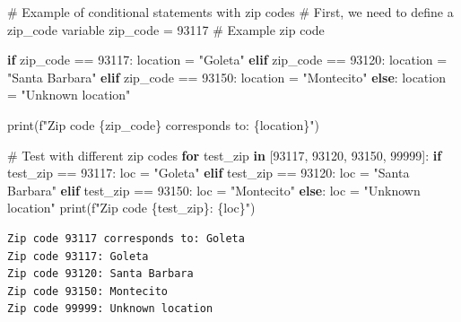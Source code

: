 \documentclass[
  11pt,
]{article}
\newenvironment{Shaded}{\begin{snugshade}}{\end{snugshade}}
\newcommand{\BuiltInTok}[1]{\textcolor[rgb]{0.00,0.23,0.31}{#1}}
\newcommand{\CommentTok}[1]{\textcolor[rgb]{0.37,0.37,0.37}{#1}}
\newcommand{\ControlFlowTok}[1]{\textcolor[rgb]{0.00,0.23,0.31}{\textbf{#1}}}
\newcommand{\DecValTok}[1]{\textcolor[rgb]{0.68,0.00,0.00}{#1}}
\newcommand{\KeywordTok}[1]{\textcolor[rgb]{0.00,0.23,0.31}{\textbf{#1}}}
\newcommand{\NormalTok}[1]{\textcolor[rgb]{0.00,0.23,0.31}{#1}}
\newcommand{\OperatorTok}[1]{\textcolor[rgb]{0.37,0.37,0.37}{#1}}
\newcommand{\SpecialCharTok}[1]{\textcolor[rgb]{0.37,0.37,0.37}{#1}}
\newcommand{\SpecialStringTok}[1]{\textcolor[rgb]{0.13,0.47,0.30}{#1}}
\newcommand{\StringTok}[1]{\textcolor[rgb]{0.13,0.47,0.30}{#1}}
\begin{document}
\begin{Shaded}
\begin{Highlighting}[]
\CommentTok{\# Example of conditional statements with zip codes}
\CommentTok{\# First, we need to define a zip\_code variable}
\NormalTok{zip\_code }\OperatorTok{=} \DecValTok{93117}  \CommentTok{\# Example zip code}

\ControlFlowTok{if}\NormalTok{ zip\_code }\OperatorTok{==} \DecValTok{93117}\NormalTok{:}
\NormalTok{    location }\OperatorTok{=} \StringTok{"Goleta"}
\ControlFlowTok{elif}\NormalTok{ zip\_code }\OperatorTok{==} \DecValTok{93120}\NormalTok{:}
\NormalTok{    location }\OperatorTok{=} \StringTok{"Santa Barbara"}
\ControlFlowTok{elif}\NormalTok{ zip\_code }\OperatorTok{==} \DecValTok{93150}\NormalTok{:}
\NormalTok{    location }\OperatorTok{=} \StringTok{"Montecito"}
\ControlFlowTok{else}\NormalTok{:}
\NormalTok{    location }\OperatorTok{=} \StringTok{"Unknown location"}

\BuiltInTok{print}\NormalTok{(}\SpecialStringTok{f"Zip code }\SpecialCharTok{\{}\NormalTok{zip\_code}\SpecialCharTok{\}}\SpecialStringTok{ corresponds to: }\SpecialCharTok{\{}\NormalTok{location}\SpecialCharTok{\}}\SpecialStringTok{"}\NormalTok{)}

\CommentTok{\# Test with different zip codes}
\ControlFlowTok{for}\NormalTok{ test\_zip }\KeywordTok{in}\NormalTok{ [}\DecValTok{93117}\NormalTok{, }\DecValTok{93120}\NormalTok{, }\DecValTok{93150}\NormalTok{, }\DecValTok{99999}\NormalTok{]:}
    \ControlFlowTok{if}\NormalTok{ test\_zip }\OperatorTok{==} \DecValTok{93117}\NormalTok{:}
\NormalTok{        loc }\OperatorTok{=} \StringTok{"Goleta"}
    \ControlFlowTok{elif}\NormalTok{ test\_zip }\OperatorTok{==} \DecValTok{93120}\NormalTok{:}
\NormalTok{        loc }\OperatorTok{=} \StringTok{"Santa Barbara"}
    \ControlFlowTok{elif}\NormalTok{ test\_zip }\OperatorTok{==} \DecValTok{93150}\NormalTok{:}
\NormalTok{        loc }\OperatorTok{=} \StringTok{"Montecito"}
    \ControlFlowTok{else}\NormalTok{:}
\NormalTok{        loc }\OperatorTok{=} \StringTok{"Unknown location"}
    \BuiltInTok{print}\NormalTok{(}\SpecialStringTok{f"Zip code }\SpecialCharTok{\{}\NormalTok{test\_zip}\SpecialCharTok{\}}\SpecialStringTok{: }\SpecialCharTok{\{}\NormalTok{loc}\SpecialCharTok{\}}\SpecialStringTok{"}\NormalTok{)}
\end{Highlighting}
\end{Shaded}

\begin{verbatim}
Zip code 93117 corresponds to: Goleta
Zip code 93117: Goleta
Zip code 93120: Santa Barbara
Zip code 93150: Montecito
Zip code 99999: Unknown location
\end{verbatim}
\end{document}

